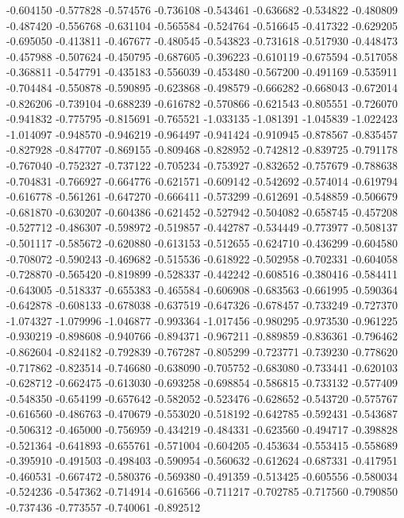 -0.604150
-0.577828
-0.574576
-0.736108
-0.543461
-0.636682
-0.534822
-0.480809
-0.487420
-0.556768
-0.631104
-0.565584
-0.524764
-0.516645
-0.417322
-0.629205
-0.695050
-0.413811
-0.467677
-0.480545
-0.543823
-0.731618
-0.517930
-0.448473
-0.457988
-0.507624
-0.450795
-0.687605
-0.396223
-0.610119
-0.675594
-0.517058
-0.368811
-0.547791
-0.435183
-0.556039
-0.453480
-0.567200
-0.491169
-0.535911
-0.704484
-0.550878
-0.590895
-0.623868
-0.498579
-0.666282
-0.668043
-0.672014
-0.826206
-0.739104
-0.688239
-0.616782
-0.570866
-0.621543
-0.805551
-0.726070
-0.941832
-0.775795
-0.815691
-0.765521
-1.033135
-1.081391
-1.045839
-1.022423
-1.014097
-0.948570
-0.946219
-0.964497
-0.941424
-0.910945
-0.878567
-0.835457
-0.827928
-0.847707
-0.869155
-0.809468
-0.828952
-0.742812
-0.839725
-0.791178
-0.767040
-0.752327
-0.737122
-0.705234
-0.753927
-0.832652
-0.757679
-0.788638
-0.704831
-0.766927
-0.664776
-0.621571
-0.609142
-0.542692
-0.574014
-0.619794
-0.616778
-0.561261
-0.647270
-0.666411
-0.573299
-0.612691
-0.548859
-0.506679
-0.681870
-0.630207
-0.604386
-0.621452
-0.527942
-0.504082
-0.658745
-0.457208
-0.527712
-0.486307
-0.598972
-0.519857
-0.442787
-0.534449
-0.773977
-0.508137
-0.501117
-0.585672
-0.620880
-0.613153
-0.512655
-0.624710
-0.436299
-0.604580
-0.708072
-0.590243
-0.469682
-0.515536
-0.618922
-0.502958
-0.702331
-0.604058
-0.728870
-0.565420
-0.819899
-0.528337
-0.442242
-0.608516
-0.380416
-0.584411
-0.643005
-0.518337
-0.655383
-0.465584
-0.606908
-0.683563
-0.661995
-0.590364
-0.642878
-0.608133
-0.678038
-0.637519
-0.647326
-0.678457
-0.733249
-0.727370
-1.074327
-1.079996
-1.046877
-0.993364
-1.017456
-0.980295
-0.973530
-0.961225
-0.930219
-0.898608
-0.940766
-0.894371
-0.967211
-0.889859
-0.836361
-0.796462
-0.862604
-0.824182
-0.792839
-0.767287
-0.805299
-0.723771
-0.739230
-0.778620
-0.717862
-0.823514
-0.746680
-0.638090
-0.705752
-0.683080
-0.733441
-0.620103
-0.628712
-0.662475
-0.613030
-0.693258
-0.698854
-0.586815
-0.733132
-0.577409
-0.548350
-0.654199
-0.657642
-0.582052
-0.523476
-0.628652
-0.543720
-0.575767
-0.616560
-0.486763
-0.470679
-0.553020
-0.518192
-0.642785
-0.592431
-0.543687
-0.506312
-0.465000
-0.756959
-0.434219
-0.484331
-0.623560
-0.494717
-0.398828
-0.521364
-0.641893
-0.655761
-0.571004
-0.604205
-0.453634
-0.553415
-0.558689
-0.395910
-0.491503
-0.498403
-0.590954
-0.560632
-0.612624
-0.687331
-0.417951
-0.460531
-0.667472
-0.580376
-0.569380
-0.491359
-0.513425
-0.605556
-0.580034
-0.524236
-0.547362
-0.714914
-0.616566
-0.711217
-0.702785
-0.717560
-0.790850
-0.737436
-0.773557
-0.740061
-0.892512
